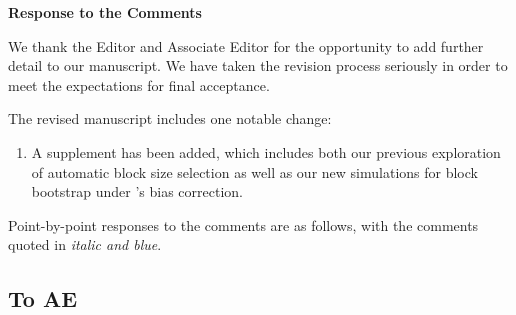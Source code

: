 \documentclass[12pt]{article}
\begin{document}
\begin{center}
  {\Large\bf Response to the Comments}
\end{center}


We thank the Editor and Associate Editor for the opportunity to add
further detail to our manuscript.
We have taken the revision process seriously in order
to meet the expectations for final acceptance.


The revised manuscript includes one notable change:
\begin{enumerate}
\item A supplement has been added, which includes both
our previous exploration of automatic block size selection as
well as our new simulations for block bootstrap under
\citet{babu2004goodness}'s bias correction.
\end{enumerate}


Point-by-point responses to the comments are as follows, with the
comments quoted in \emph{\color{darkblue} italic and blue}.


\subsection*{To AE}
\end{document}
